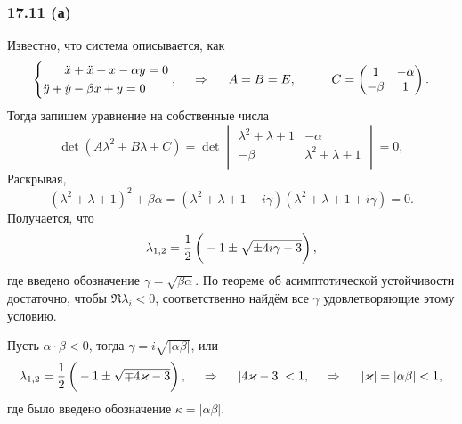 


\subsubsection*{17.11 (а)}

Известно, что система описывается, как
\begin{equation*}
    \left\{\begin{aligned}
        \ddot{x} + \ddot{x} + x - \alpha y &= 0 \\
        \ddot{y} + \dot{y} - \beta x + y = 0
    \end{aligned}\right.
    , \hspace{0.5cm} \Rightarrow \hspace{0.5cm}
    A = B = E, \hspace{1 cm}
    C = \begin{pmatrix}
        1 & -\alpha \\
        -\beta & 1 \\
    \end{pmatrix}.
\end{equation*}
Тогда запишем уравнение на собственные числа
\begin{equation*}
    \det\left(
        A \lambda^2 + B\lambda + C
    \right) = \det
    \begin{vmatrix}
        \lambda^2 + \lambda + 1 & -\alpha \\
        -\beta & \lambda^2+\lambda+1 \\
    \end{vmatrix} = 0,
\end{equation*}
Раскрывая,
\begin{equation*}
    (\lambda^2 + \lambda + 1)^2 + \beta \alpha = 
    \left(
        \lambda^2 + \lambda + 1 - i \gamma
    \right)
    \left(
        \lambda^2 + \lambda + 1 + i \gamma
    \right) = 0.
\end{equation*}
Получается, что
\begin{equation*}
    \lambda_{1, 2} = \frac{1}{2} \left(
        \vphantom{\frac{1}{2}}
        -1 \pm \sqrt{
        \pm 4 i \gamma - 3
        }
    \right),
\end{equation*}
где введено обозначение $\gamma = \sqrt{\beta \alpha}$. По теореме об асимптотической устойчивости достаточно, чтобы $\Re \lambda_i < 0$, соответственно найдём все $\gamma$ удовлетворяющие этому условию.

Пусть $\alpha \cdot \beta < 0$, тогда $\gamma = i \sqrt{|\alpha \beta|}$, или
\begin{equation*}
    \lambda_{1, 2} = \frac{1}{2}\left(
    \vphantom{\frac{1}{2}}
    -1 \pm \sqrt{\mp 4 \kappa - 3}
    \right),
    \hspace{0.5cm} \Rightarrow \hspace{0.5cm}
    |4 \kappa - 3| < 1,
    \hspace{0.5cm} \Rightarrow \hspace{0.5cm}
    |\kappa| = |\alpha \beta | < 1,
\end{equation*}
где было введено обозначение $\kappa = |\alpha \beta|$.


